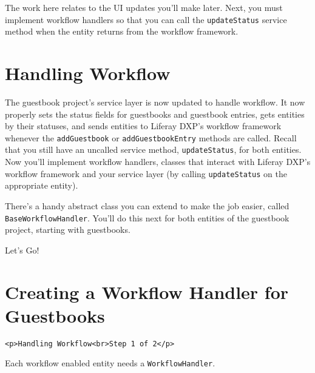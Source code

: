 The work here relates to the UI updates you'll make later. Next, you
must implement workflow handlers so that you can call the
\texttt{updateStatus} service method when the entity returns from the
workflow framework.

\chapter{Handling Workflow}\label{handling-workflow}

The guestbook project's service layer is now updated to handle workflow.
It now properly sets the status fields for guestbooks and guestbook
entries, gets entities by their statuses, and sends entities to Liferay
DXP's workflow framework whenever the \texttt{addGuestbook} or
\texttt{addGuestbookEntry} methods are called. Recall that you still
have an uncalled service method, \texttt{updateStatus}, for both
entities. Now you'll implement workflow handlers, classes that interact
with Liferay DXP's workflow framework and your service layer (by calling
\texttt{updateStatus} on the appropriate entity).

There's a handy abstract class you can extend to make the job easier,
called \texttt{BaseWorkflowHandler}. You'll do this next for both
entities of the guestbook project, starting with guestbooks.

Let's Go!{}

\chapter{Creating a Workflow Handler for
Guestbooks}\label{creating-a-workflow-handler-for-guestbooks}

\begin{verbatim}
<p>Handling Workflow<br>Step 1 of 2</p>
\end{verbatim}

Each workflow enabled entity needs a \texttt{WorkflowHandler}.

